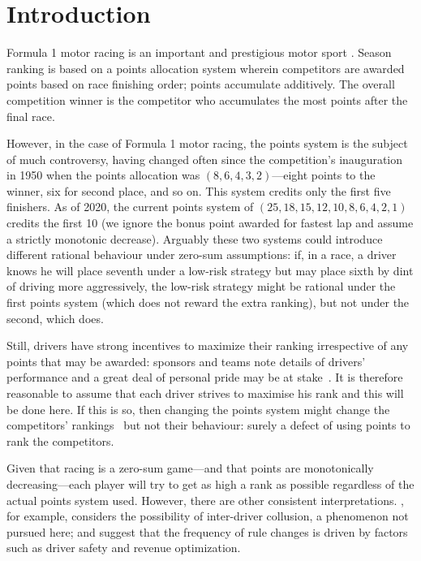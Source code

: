 \documentclass[a4,12pt]{article}
\begin{document}
\newpage

\section{\centering Introduction}\label{introduction}
Formula 1 motor racing is an important and prestigious motor sport
\citep{codling2017,jenkins2010}.  Season ranking is based on a points
allocation system wherein competitors are awarded points based on race
finishing order; points accumulate additively.  The overall
competition winner is the competitor who accumulates the most points
after the final race.

However, in the case of Formula 1 motor racing, the points system is
the subject of much controversy, having changed often since the
competition's inauguration in 1950 when the points allocation was
$(8,6,4,3,2)$---eight points to the winner, six for second place, and
so on.  This system credits only the first five finishers.  As of
2020, the current points system of $(25,18,15,12,10,8,6,4,2,1)$
credits the first 10 (we ignore the bonus point awarded for fastest
lap and assume a strictly monotonic decrease).  Arguably these two
systems could introduce different rational behaviour under zero-sum
assumptions: if, in a race, a driver knows he will place seventh under
a low-risk strategy but may place sixth by dint of driving more
aggressively, the low-risk strategy might be rational under the first
points system (which does not reward the extra ranking), but not under
the second, which does.

Still, drivers have strong incentives to maximize their ranking
irrespective of any points that may be awarded: sponsors and teams
note details of drivers' performance and a great deal of personal
pride may be at stake~\citep{gayrees2019}.  It is therefore reasonable
to assume that each driver strives to maximise his rank and this will
be done here.  If this is so, then changing the points system might
change the competitors' rankings~\citep{wood2020} but not their
behaviour: surely a defect of using points to rank the competitors.

Given that racing is a zero-sum game---and that points are
monotonically decreasing---each player will try to get as high a rank
as possible regardless of the actual points system used.  However,
there are other consistent interpretations. \cite{bakhrankova2011},
for example, considers the possibility of inter-driver collusion, a
phenomenon not pursued here; and \cite{mastromarco2009} suggest that
the frequency of rule changes is driven by factors such as driver
safety and revenue optimization.
\end{document}
